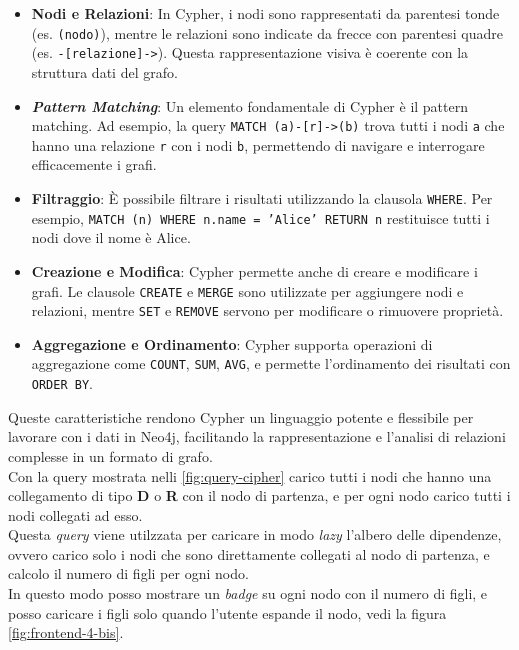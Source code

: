 \begin{itemize}
\item \textbf{Nodi e Relazioni}: In Cypher, i nodi sono rappresentati da parentesi tonde (es. \texttt{(nodo)}), 
mentre le relazioni sono indicate da frecce con parentesi quadre (es. \texttt{-[relazione]->}). Questa rappresentazione visiva è coerente con la struttura dati del grafo.

\item \textbf{\textit{Pattern Matching}}: Un elemento fondamentale di Cypher è il pattern matching. 
Ad esempio, la query \texttt{MATCH (a)-[r]->(b)} trova tutti i nodi \texttt{a} che hanno una relazione \texttt{r} con i nodi \texttt{b}, permettendo di navigare e interrogare efficacemente i grafi.

\item \textbf{Filtraggio}: È possibile filtrare i risultati utilizzando la clausola \texttt{WHERE}. 
Per esempio, \texttt{MATCH (n) WHERE n.name = 'Alice' RETURN n} restituisce tutti i nodi dove il nome è Alice.

\item \textbf{Creazione e Modifica}: Cypher permette anche di creare e modificare i grafi. 
Le clausole \texttt{CREATE} e \texttt{MERGE} sono utilizzate per aggiungere nodi e relazioni, mentre \texttt{SET} e \texttt{REMOVE} servono per modificare o rimuovere proprietà.

\item \textbf{Aggregazione e Ordinamento}: Cypher supporta operazioni di aggregazione come \texttt{COUNT}, \texttt{SUM}, 
\texttt{AVG}, e permette l'ordinamento dei risultati con \texttt{ORDER BY}.
\end{itemize}

Queste caratteristiche rendono Cypher un linguaggio potente e flessibile per lavorare con i dati in Neo4j, 
facilitando la rappresentazione e l'analisi di relazioni complesse in un formato di grafo.\\

Con la query mostrata nelli \snippet{} \ref*{fig:query-cipher} carico tutti i nodi che hanno una collegamento di tipo \textbf{D} o \textbf{R} con il nodo di partenza,
e per ogni nodo carico tutti i nodi collegati ad esso.\\
Questa \textit{query} viene utilzzata per caricare in modo \textit{lazy} l'albero delle dipendenze, ovvero carico solo i nodi che sono direttamente collegati al nodo di partenza,
e calcolo il numero di figli per ogni nodo.\\ In questo modo posso mostrare un \textit{badge} su ogni nodo con il numero di figli, e posso caricare i figli solo quando l'utente espande il nodo, 
vedi la figura \ref{fig:frontend-4-bis}.\\

